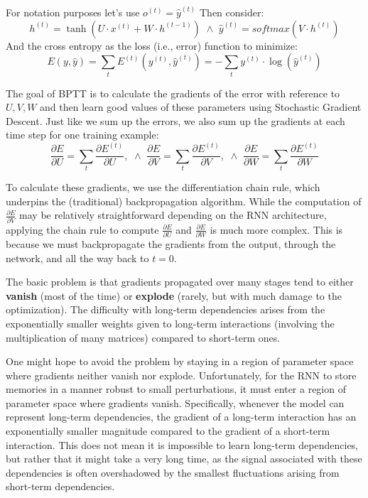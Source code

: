 For notation purposes let's use $o^{(t)} =  \hat{y}^{(t)}$ Then consider:
\begin{equation}
    h^{(t)} = \tanh (U \cdot x^{(t)} + W \cdot h^{(t - 1)}) \,\, \land \,\, \hat{y}^{(t)} = softmax(V \cdot h^{(t)})
\end{equation}
And the cross entropy as the loss (i.e., error) function to minimize:
\begin{equation}
    E(y, \hat{y}) = \sum_t E^{(t)}(y^{(t)}, \hat{y}^{(t)}) = - \sum_t y^{(t)} \cdot \log(\hat{y}^{(t)})
\end{equation}

The goal of BPTT is to calculate the gradients of the error with reference to
$U, V, W$ and then learn good values of these parameters using Stochastic Gradient
Descent. Just like we sum up the errors, we also sum up the gradients at each
time step for one training example:
\begin{equation}
    \frac{\partial E}{\partial U} = \sum_t \frac{\partial E^{(t)}}{\partial U}, \,\, \land \,\,
    \frac{\partial E}{\partial V} = \sum_t \frac{\partial E^{(t)}}{\partial V}, \,\, \land \,\,
    \frac{\partial E}{\partial W} = \sum_t \frac{\partial E^{(t)}}{\partial W}
\end{equation}

To calculate these gradients, we use the differentiation chain rule, which
underpins the (traditional) backpropagation algorithm. While the computation of
$\frac{\partial E}{\partial V}$ may be relatively straightforward depending on
the RNN architecture, applying the chain rule to compute $\frac{\partial E}{\partial U}$
and $\frac{\partial E}{\partial W}$ is much more complex. This is because we must
backpropagate the gradients from the output, through the network, and all the way
back to $t = 0$.

The basic problem is that gradients propagated over many stages tend to either
\textbf{vanish} (most of the time) or \textbf{explode} (rarely, but with much
damage to the optimization). The difficulty with long-term dependencies arises
from the exponentially smaller weights given to long-term interactions (involving
the multiplication of many matrices) compared to short-term ones.

One might hope to avoid the problem by staying in a region of parameter space where
gradients neither vanish nor explode. Unfortunately, for the RNN to store memories
in a manner robust to small perturbations, it must enter a region of parameter
space where gradients vanish. Specifically, whenever the model can represent
long-term dependencies, the gradient of a long-term interaction has an exponentially
smaller magnitude compared to the gradient of a short-term interaction. This does
not mean it is impossible to learn long-term dependencies, but rather that it
might take a very long time, as the signal associated with these dependencies is
often overshadowed by the smallest fluctuations arising from short-term dependencies.

